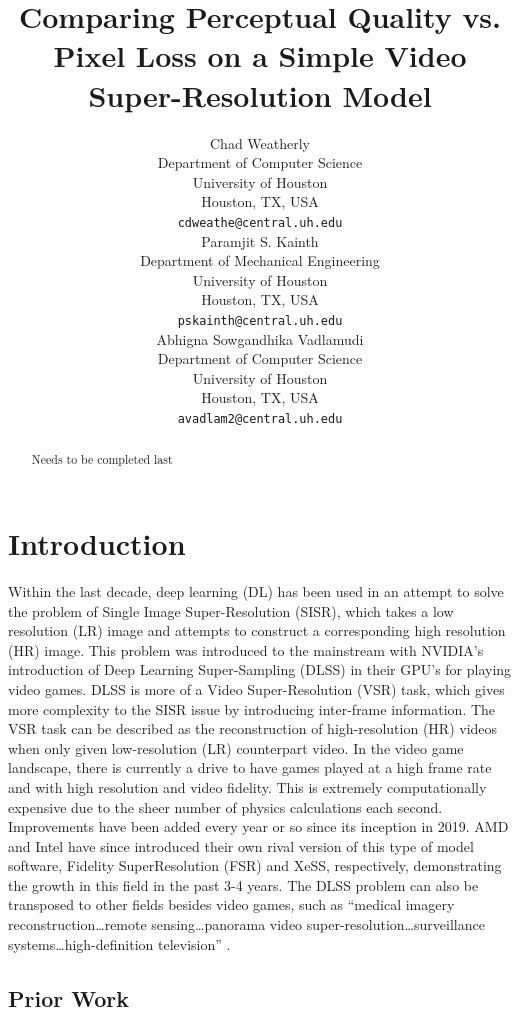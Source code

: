 \documentclass{article}
\title{Comparing Perceptual Quality vs. Pixel Loss on a Simple Video Super-Resolution Model}
\author{
  Chad Weatherly \\
  Department of Computer Science \\
  University of Houston \\
  Houston, TX, USA \\
  \texttt{cdweathe@central.uh.edu} \\
  \And
  Paramjit S. Kainth \\
  Department of Mechanical Engineering \\
  University of Houston \\
  Houston, TX, USA \\
  \texttt{pskainth@central.uh.edu} \\
  \And
  Abhigna Sowgandhika Vadlamudi \\
  Department of Computer Science \\
  University of Houston \\
  Houston, TX, USA \\
  \texttt{avadlam2@central.uh.edu} \\
}
\begin{document}
\maketitle

\begin{abstract}
 Needs to be completed last
\end{abstract}

\section{Introduction}

 Within the last decade, deep learning (DL) has been used in an attempt to solve the problem of Single Image Super-Resolution (SISR), which takes a low resolution (LR) image and attempts to construct a corresponding high resolution (HR) image. This problem was introduced to the mainstream with NVIDIA’s introduction of Deep Learning Super-Sampling (DLSS) in their GPU’s for playing video games. DLSS is more of a Video Super-Resolution (VSR) task, which gives more complexity to the SISR issue by introducing inter-frame information. The VSR task can be described as the reconstruction of high-resolution (HR) videos when only given low-resolution (LR) counterpart video. In the video game landscape, there is currently a drive to have games played at a high frame rate and with high resolution and video fidelity. This is extremely computationally expensive due to the sheer number of physics calculations each second. Improvements have been added every year or so since its inception in 2019. AMD and Intel have since introduced their own rival version of this type of model software, Fidelity SuperResolution (FSR) and XeSS, respectively, demonstrating the growth in this field in the past 3-4 years. The DLSS problem can also be transposed to other fields besides video games, such as “medical imagery reconstruction…remote sensing…panorama video super-resolution…surveillance systems…high-definition television” \cite{liu_video_2022}. 

\subsection{Prior Work}
 
\end{document}
